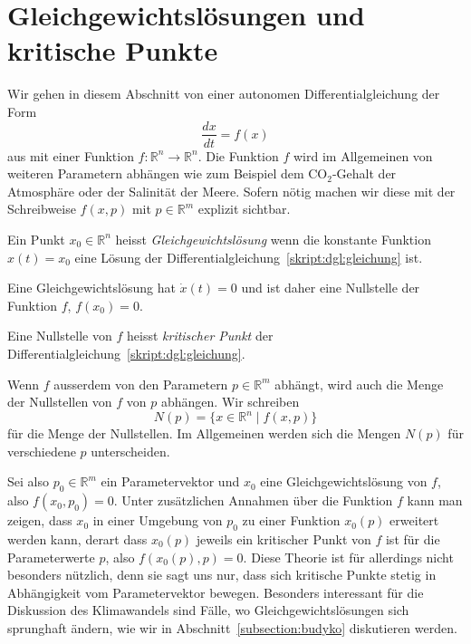%
%
%
\section{Gleichgewichtslösungen und kritische Punkte}
Wir gehen in diesem Abschnitt von einer autonomen Differentialgleichung
der Form
\begin{equation}
\frac{dx}{dt} = f(x)
\label{skript:dgl:gleichung}
\end{equation}
aus
mit einer Funktion $f\colon \mathbb R^n \to \mathbb R^n$.
Die Funktion $f$ wird im Allgemeinen von weiteren Parametern abhängen
wie zum Beispiel dem $\text{CO}_2$-Gehalt der Atmosphäre oder der Salinität
der Meere.
Sofern nötig machen wir diese mit der Schreibweise $f(x,p)$ mit
$p\in\mathbb R^m$ explizit sichtbar.

\begin{definition}
Ein Punkt $x_0\in\mathbb R^n$ heisst {\em Gleichgewichtslösung}
wenn die konstante Funktion $x(t)=x_0$ eine Lösung der
Differentialgleichung~\ref{skript:dgl:gleichung} ist.
\end{definition}

Eine Gleichgewichtslösung hat $\dot{x}(t)=0$ und ist daher eine
Nullstelle der Funktion $f$,
$f(x_0)=0$.
\begin{definition}
Eine Nullstelle von $f$ heisst {\em kritischer Punkt} der
Differentialgleichung~\ref{skript:dgl:gleichung}.
\end{definition}
%

Wenn $f$ ausserdem von den Parametern $p\in\mathbb R^m$ abhängt,
wird auch die Menge der Nullstellen von $f$ von $p$ abhängen.
Wir schreiben
\[
N(p) = \{x\in\mathbb R^n\;|\; f(x,p)\}
\]
für die Menge der Nullstellen. 
Im Allgemeinen werden sich die Mengen $N(p)$ für verschiedene $p$ 
unterscheiden.

Sei also $p_0\in\mathbb R^m$ ein Parametervektor und $x_0$ eine
Gleichgewichtslösung von $f$, also $f(x_0,p_0)=0$.
Unter zusätzlichen Annahmen über die Funktion $f$ kann man zeigen,
dass $x_0$ in einer Umgebung von $p_0$ zu einer Funktion
$x_0(p)$ erweitert werden kann, derart dass $x_0(p)$ jeweils ein
kritischer Punkt von $f$ ist für die Parameterwerte $p$, also
$f(x_0(p),p)=0$.
Diese Theorie ist für allerdings nicht besonders nützlich, denn
sie sagt uns nur, dass sich kritische Punkte stetig in Abhängigkeit vom
Parametervektor bewegen.
Besonders interessant für die Diskussion des Klimawandels sind
Fälle, wo Gleichgewichtslösungen sich sprunghaft ändern, wie wir in
Abschnitt~\ref{subsection:budyko} diskutieren werden.

